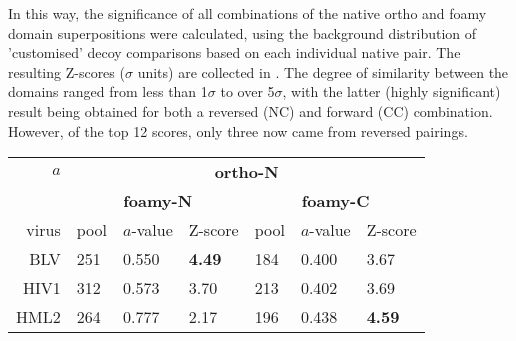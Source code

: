 In this way, the significance of all combinations of the native ortho and foamy domain
superpositions were calculated, using the background distribution of 'customised' decoy
comparisons based on each individual native pair.   The resulting Z-scores ($\sigma$ units)
are collected in .   The degree of similarity between the domains ranged from
less than 1$\sigma$ to over 5$\sigma$, with the latter (highly significant) result being
obtained for both a reversed (NC) and forward (CC) combination.   However, of the top 12
scores, only three now came from reversed pairings. 

\begin{table}
\centering
\begin{tabular}{r|lll|lll|}
$a$  & \multicolumn{6}{c|}{\bf ortho-N} \\
     & \multicolumn{3}{c|}{\bf foamy-N} & \multicolumn{3}{c|}{\bf foamy-C}  \\
\hline \hline
virus  & pool & $a$-value & Z-score & pool & $a$-value & Z-score \\
\hline
BLV    &  251  & 0.550 & {\bf 4.49} &  184  & 0.400 &      3.67  \\
HIV1   &  312  & 0.573 &      3.70  &  213  & 0.402 &      3.69  \\
HML2   &  264  & 0.777 &      2.17  &  196  & 0.438 & {\bf 4.59} \\

\end{tabular}
\end{table}
